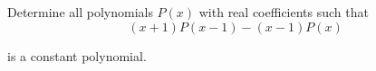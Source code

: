 Determine all polynomials $P(x)$ with real coefficients such that\[(x+1)P(x-1)-(x-1)P(x)\]

is a constant polynomial.